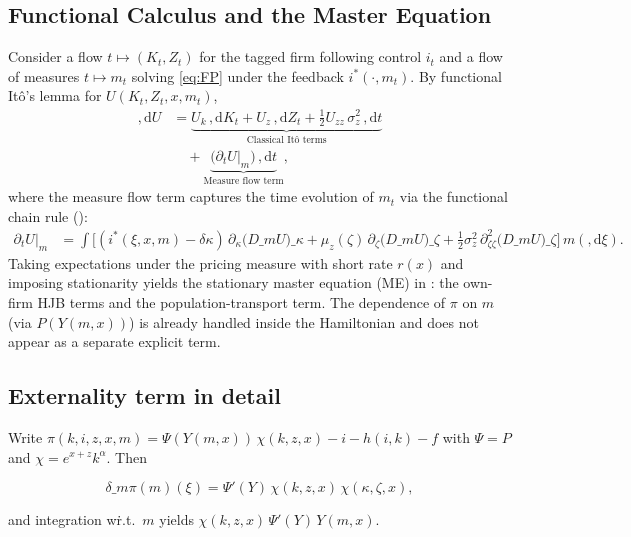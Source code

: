 ﻿\documentclass[11pt,letterpaper,oneside]{article}
\numberwithin{equation}{section}
\newcommand{\1}{\mathbf{1}}
\newcommand{\diff}{,\mathrm{d}}
\newcommand{\Dm}{D\_m}
\begin{document}
\subsection*{Functional Calculus and the Master Equation}\label{app:master-derivation}
Consider a flow $t\mapsto (K_t,Z_t)$ for the tagged firm following control $i_t$ and a flow of measures $t\mapsto m_t$ solving \eqref{eq:FP} under the feedback $i^*(\cdot,m_t)$. By functional Itô's lemma for $U(K_t,Z_t,x,m_t)$,
\begin{align*}
\diff U &= \underbrace{U_k\,\diff K_t + U_z\,\diff Z_t + \tfrac12 U_{zz}\,\sigma_z^2\,\diff t}_{\text{Classical Itô terms}} \\
        &\quad + \underbrace{\big(\partial_t U\big|_{m}\big)\,\diff t}_{\text{Measure flow term}},
\end{align*}
where the measure flow term captures the time evolution of $m_t$ via the functional chain rule ():
\begin{align*}
\partial_t U\big|_{m} &= \int \Big[ (i^*(\xi,x,m)-\delta\kappa)\,\partial_{\kappa}\big(\Dm U\big)\!\_\kappa
  +\mu_z(\zeta)\,\partial_{\zeta}\big(\Dm U\big)\!\_\zeta
  +\tfrac12\sigma_z^2\,\partial_{\zeta\zeta}^2\big(\Dm U\big)\!\_\zeta\Big] \, m(\diff \xi).
\end{align*}
Taking expectations under the pricing measure with short rate $r(x)$ and imposing stationarity yields the stationary master equation (ME) in : the own-firm HJB terms and the population-transport term. The dependence of $\pi$ on $m$ (via $P(Y(m,x))$) is already handled inside the Hamiltonian and does not appear as a separate explicit term.

\subsection*{Externality term in detail}
Write $\pi(k,i,z,x,m)=\Psi(Y(m,x))\,\chi(k,z,x)-i-h(i,k)-f$ with $\Psi=P$ and $\chi=e^{x+z}k^\alpha$. Then

$$
\delta\_m\pi(m)(\xi)=\Psi'(Y)\,\chi(k,z,x)\,\chi(\kappa,\zeta,x),
$$

and integration w\.r.t.\ $m$ yields $\chi(k,z,x)\,\Psi'(Y)\,Y(m,x)$.


\end{document}

